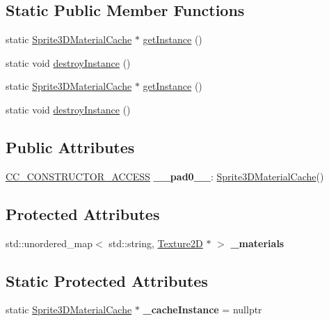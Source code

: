 \subsection*{Static Public Member Functions}
\begin{DoxyCompactItemize}
\item 
static \hyperlink{classSprite3DMaterialCache}{Sprite3\+D\+Material\+Cache} $\ast$ \hyperlink{classSprite3DMaterialCache_ad3412933a6e69e39648683ffc39b9846}{get\+Instance} ()
\item 
static void \hyperlink{classSprite3DMaterialCache_acfcbb0b4674cba4bc86f3e55395ac9a4}{destroy\+Instance} ()
\item 
static \hyperlink{classSprite3DMaterialCache}{Sprite3\+D\+Material\+Cache} $\ast$ \hyperlink{classSprite3DMaterialCache_a295112124758c44b444699d5e79ee9ef}{get\+Instance} ()
\item 
static void \hyperlink{classSprite3DMaterialCache_abdcd2e35e4d742d54b791c98573528bb}{destroy\+Instance} ()
\end{DoxyCompactItemize}
\subsection*{Public Attributes}
\begin{DoxyCompactItemize}
\item 
\mbox{\label{classSprite3DMaterialCache_a4050615c6cf06bb532e6a44dd5088dc1}} 
\hyperlink{_2cocos2d_2cocos_2base_2ccConfig_8h_a25ef1314f97c35a2ed3d029b0ead6da0}{C\+C\+\_\+\+C\+O\+N\+S\+T\+R\+U\+C\+T\+O\+R\+\_\+\+A\+C\+C\+E\+SS} {\bfseries \+\_\+\+\_\+pad0\+\_\+\+\_\+}\+: \hyperlink{classSprite3DMaterialCache}{Sprite3\+D\+Material\+Cache}()
\end{DoxyCompactItemize}
\subsection*{Protected Attributes}
\begin{DoxyCompactItemize}
\item 
\mbox{\label{classSprite3DMaterialCache_ae206a3dcbe099775ac699cc26ee38453}} 
std\+::unordered\+\_\+map$<$ std\+::string, \hyperlink{classTexture2D}{Texture2D} $\ast$ $>$ {\bfseries \+\_\+materials}
\end{DoxyCompactItemize}
\subsection*{Static Protected Attributes}
\begin{DoxyCompactItemize}
\item 
\mbox{\label{classSprite3DMaterialCache_a8d57c57bb69b0e3d508f3e597ad035ba}} 
static \hyperlink{classSprite3DMaterialCache}{Sprite3\+D\+Material\+Cache} $\ast$ {\bfseries \+\_\+cache\+Instance} = nullptr
\end{DoxyCompactItemize}


